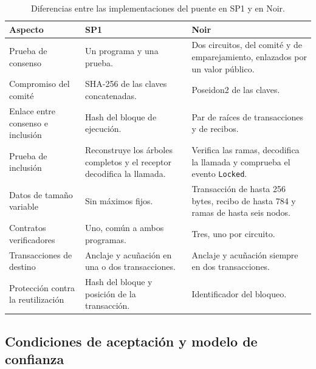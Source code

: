 \begin{table}[htbp]
	\centering
	\caption{Diferencias entre las implementaciones del puente en SP1 y en Noir.}
	\label{tab:puente_variantes}
	\footnotesize
	\begin{tabular}{>{\raggedright\arraybackslash}p{3.5cm} >{\raggedright\arraybackslash}p{5.8cm}
		>{\raggedright\arraybackslash}p{5.8cm}}
		\toprule
		\textbf{Aspecto} & \textbf{SP1} & \textbf{Noir} \\
		\midrule
		Prueba de consenso & Un programa y una prueba. & Dos circuitos, del comité y de
		emparejamiento, enlazados por un valor público. \\
		\addlinespace
		Compromiso del comité & SHA-256 de las claves concatenadas. & Poseidon2 de las claves. \\
		\addlinespace
		Enlace entre consenso e inclusión & Hash del bloque de ejecución. & Par de raíces de
		transacciones y de recibos. \\
		\addlinespace
		Prueba de inclusión & Reconstruye los árboles completos y el receptor decodifica la llamada.
		& Verifica las ramas, decodifica la llamada y comprueba el evento \texttt{Locked}. \\
		\addlinespace
		Datos de tamaño variable & Sin máximos fijos. & Transacción de hasta 256 bytes, recibo de
		hasta 784 y ramas de hasta seis nodos. \\
		\addlinespace
		Contratos verificadores & Uno, común a ambos programas. & Tres, uno por circuito. \\
		\addlinespace
		Transacciones de destino & Anclaje y acuñación en una o dos transacciones. & Anclaje y
		acuñación siempre en dos transacciones. \\
		\addlinespace
		Protección contra la reutilización & Hash del bloque y posición de la transacción. &
		Identificador del bloqueo. \\
		\bottomrule
	\end{tabular}
\end{table}

\subsection{Condiciones de aceptación y modelo de confianza}
\label{sec:puente_aceptacion}

